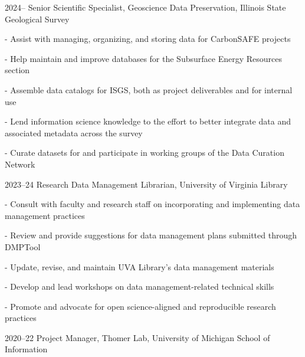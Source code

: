 \documentclass[12pt,letterpaper]{report}
\newcommand{\listitemspace}{0.25em}
\renewenvironment{itemize}
{\begin{list}{}{\setlength{\leftmargin}{0em}
            \setlength{\parskip}{0em}
            \setlength{\itemsep}{\listitemspace}
            \setlength{\parsep}{\listitemspace}}}
{\end{list}}
\begin{document}
\begin{tablist}

\item[2024--] \tab Senior Scientific Specialist, Geoscience Data Preservation, Illinois State Geological Survey

\begin{itemize} \begin{footnotesize}

	\item - Assist with managing, organizing, and storing data for CarbonSAFE projects

	\item - Help maintain and improve databases for the Subsurface Energy Resources section

	\item - Assemble data catalogs for ISGS, both as project deliverables and for internal use

	\item - Lend information science knowledge to the effort to better integrate data and associated metadata across the survey

	\item - Curate datasets for and participate in working groups of the Data Curation Network

\end{footnotesize} \end{itemize}

\item[2023--24] \tab Research Data Management Librarian, University of Virginia Library

\begin{itemize} \begin{footnotesize}

	\item - Consult with faculty and research staff on incorporating and implementing data management practices		

	\item - Review and provide suggestions for data management plans submitted through DMPTool

	\item - Update, revise, and maintain UVA Library's data management materials

	\item - Develop and lead workshops on data management-related technical skills

	\item - Promote and advocate for open science-aligned and reproducible research practices

\end{footnotesize} \end{itemize}

\item[2020--22] \tab Project Manager, Thomer Lab, University of Michigan School of Information

\end{tablist}
\end{document}
